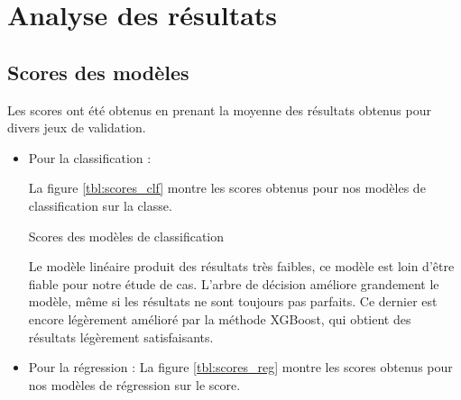 \documentclass[twocolumns]{udes_rapport}
\begin{document}
    
\section{Analyse des résultats}\label{sec:results}

    \subsection{Scores des modèles}\label{subsec:scores}
    
        Les scores ont été obtenus en prenant la moyenne des résultats obtenus pour divers jeux de validation.
        
        \begin{itemize}
            \item Pour la classification :
            
            La figure \ref{tbl:scores_clf} montre les scores obtenus pour nos modèles de classification sur la classe. 
            \begin{table}
                \centering
                \caption{Scores des modèles de classification}
                \label{tbl:scores_clf}
            \end{table}
    
            Le modèle linéaire produit des résultats très faibles, ce modèle est loin d'être fiable pour notre étude de cas. L'arbre de décision améliore grandement le modèle, même si les résultats ne sont toujours pas parfaits. Ce dernier est encore légèrement amélioré par la méthode \textsf{XGBoost}, qui obtient des résultats légèrement satisfaisants.

            \item Pour la régression :
            La figure \ref{tbl:scores_reg} montre les scores obtenus pour nos modèles de régression sur le score. 


\end{itemize}
\end{document}
